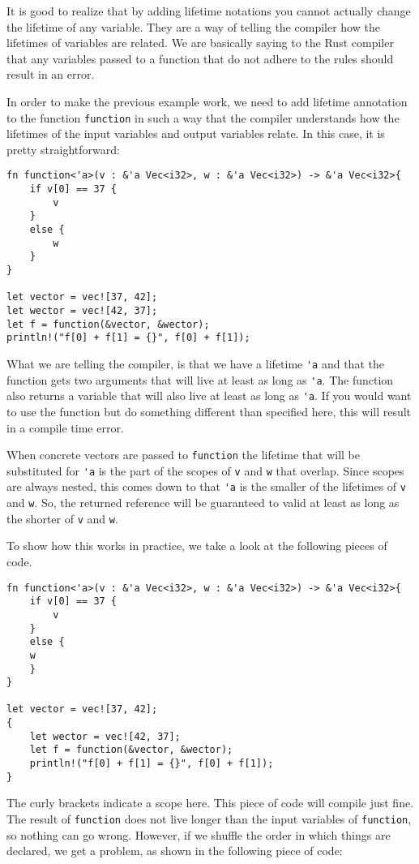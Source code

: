 It is good to realize that by adding lifetime notations you cannot actually change the lifetime of any variable. They are a way of telling the compiler how the lifetimes of variables are related. We are basically saying to the Rust compiler that any variables passed to a function that do not adhere to the rules should result in an error. 

In order to make the previous example work, we need to add lifetime annotation to the function \verb|function| in such a way that the compiler understands how the lifetimes of the input variables and output variables relate. In this case, it is pretty straightforward: 

\begin{verbatim}
fn function<'a>(v : &'a Vec<i32>, w : &'a Vec<i32>) -> &'a Vec<i32>{
    if v[0] == 37 {
        v
    }
    else {
        w
    }
}

let vector = vec![37, 42];
let wector = vec![42, 37];
let f = function(&vector, &wector);
println!("f[0] + f[1] = {}", f[0] + f[1]);
\end{verbatim}

What we are telling the compiler, is that we have a lifetime \verb|'a| and that the function gets two arguments that will live at least as long as \verb|'a|. The function also returns a variable that will also live at least as long as \verb|'a|. If you would want to use the function but do something different than specified here, this will result in a compile time error. 

When concrete vectors are passed to \verb|function| the lifetime that will be substituted for \verb|'a| is the part of the scopes of \verb|v| and \verb|w| that overlap. Since scopes are always nested, this comes down to that \verb|'a| is the smaller of the lifetimes of \verb|v| and \verb|w|. So, the returned reference will be guaranteed to valid at least as long as the shorter of \verb|v| and \verb|w|.

To show how this works in practice, we take a look at the following pieces of code. 

\begin{verbatim}
fn function<'a>(v : &'a Vec<i32>, w : &'a Vec<i32>) -> &'a Vec<i32>{
    if v[0] == 37 {
        v
    }
    else {
    w
    }
}

let vector = vec![37, 42];
{
    let wector = vec![42, 37];
    let f = function(&vector, &wector);
    println!("f[0] + f[1] = {}", f[0] + f[1]);
}
\end{verbatim}
The curly brackets indicate a scope here. This piece of code will compile just fine. The result of \verb|function| does not live longer than the input variables of \verb|function|, so nothing can go wrong. However, if we shuffle the order in which things are declared, we get a problem, as shown in the following piece of code: 

